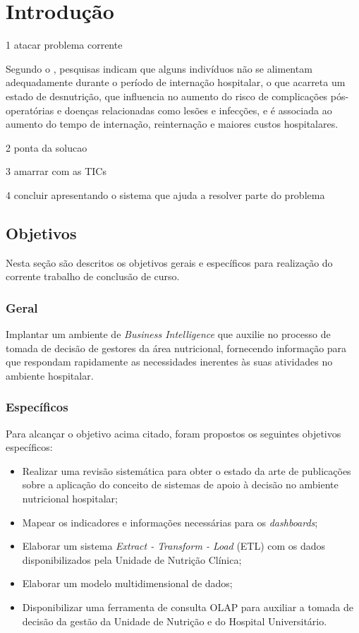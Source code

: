 \chapter{Introdução}
1 atacar problema corrente

Segundo o , pesquisas indicam que alguns indivíduos não se alimentam adequadamente durante o período de internação hospitalar, o que acarreta um estado de desnutrição, que influencia no aumento do risco de complicações pós-operatórias e doenças relacionadas como lesões e infecções, e é associada ao aumento do tempo de internação, reinternação e maiores custos hospitalares.

2 ponta da solucao

3 amarrar com as TICs

4 concluir apresentando o sistema que ajuda a resolver parte do problema

\section{Objetivos}\label{sec-divisoes}
Nesta seção são descritos os objetivos gerais e específicos para realização do corrente trabalho de conclusão de curso.

\subsection{Geral}\label{sec-divisoes-subsection}
Implantar um ambiente de \textit{Business Intelligence} que auxilie no processo de tomada de decisão de gestores da área nutricional, fornecendo informação para que respondam rapidamente as necessidades inerentes às suas atividades no ambiente hospitalar.

\subsection{Específicos}\label{sec-divisoes-subsection}
Para alcançar o objetivo acima citado, foram propostos os seguintes objetivos específicos:
\begin{itemize}
 \item Realizar uma revisão sistemática para obter o estado da arte de publicações sobre a aplicação do conceito de sistemas de apoio à decisão no ambiente nutricional hospitalar;

 \item Mapear os indicadores e informações necessárias para os \textit{dashboards};

 \item Elaborar um sistema \textit{Extract - Transform - Load} (ETL) com os dados disponibilizados pela Unidade de Nutrição Clínica;
 
 \item Elaborar um modelo multidimensional de dados;
 
 \item Disponibilizar uma ferramenta de consulta OLAP para auxiliar a tomada de decisão da gestão da Unidade de Nutrição e do Hospital Universitário.
\end{itemize}

